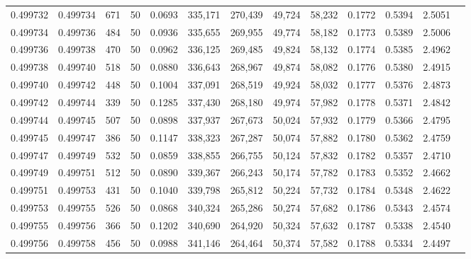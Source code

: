 \begin{tabular}{rrrrrrrrrrrrr}
0.499732 & 0.499734 & 671 &  50 &                                     0.0693 & 335,171 & 270,439 &  49,724 &  58,232 & 0.1772 & 0.5394 & 2.5051 \\
0.499734 & 0.499736 & 484 &  50 &                                     0.0936 & 335,655 & 269,955 &  49,774 &  58,182 & 0.1773 & 0.5389 & 2.5006 \\
0.499736 & 0.499738 & 470 &  50 &                                     0.0962 & 336,125 & 269,485 &  49,824 &  58,132 & 0.1774 & 0.5385 & 2.4962 \\
0.499738 & 0.499740 & 518 &  50 &                                     0.0880 & 336,643 & 268,967 &  49,874 &  58,082 & 0.1776 & 0.5380 & 2.4915 \\
0.499740 & 0.499742 & 448 &  50 &                                     0.1004 & 337,091 & 268,519 &  49,924 &  58,032 & 0.1777 & 0.5376 & 2.4873 \\
0.499742 & 0.499744 & 339 &  50 &                                     0.1285 & 337,430 & 268,180 &  49,974 &  57,982 & 0.1778 & 0.5371 & 2.4842 \\
0.499744 & 0.499745 & 507 &  50 &                                     0.0898 & 337,937 & 267,673 &  50,024 &  57,932 & 0.1779 & 0.5366 & 2.4795 \\
0.499745 & 0.499747 & 386 &  50 &                                     0.1147 & 338,323 & 267,287 &  50,074 &  57,882 & 0.1780 & 0.5362 & 2.4759 \\
0.499747 & 0.499749 & 532 &  50 &                                     0.0859 & 338,855 & 266,755 &  50,124 &  57,832 & 0.1782 & 0.5357 & 2.4710 \\
0.499749 & 0.499751 & 512 &  50 &                                     0.0890 & 339,367 & 266,243 &  50,174 &  57,782 & 0.1783 & 0.5352 & 2.4662 \\
0.499751 & 0.499753 & 431 &  50 &                                     0.1040 & 339,798 & 265,812 &  50,224 &  57,732 & 0.1784 & 0.5348 & 2.4622 \\
0.499753 & 0.499755 & 526 &  50 &                                     0.0868 & 340,324 & 265,286 &  50,274 &  57,682 & 0.1786 & 0.5343 & 2.4574 \\
0.499755 & 0.499756 & 366 &  50 &                                     0.1202 & 340,690 & 264,920 &  50,324 &  57,632 & 0.1787 & 0.5338 & 2.4540 \\
0.499756 & 0.499758 & 456 &  50 &                                     0.0988 & 341,146 & 264,464 &  50,374 &  57,582 & 0.1788 & 0.5334 & 2.4497 \\

\end{tabular}
